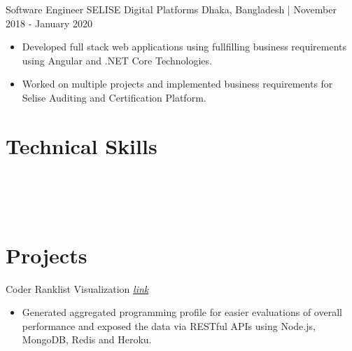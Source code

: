 \documentclass{resumestyle}
\begin{document}
    \vspace{4pt}%


    \worksubsection%
        {Software Engineer}%
        {SELISE Digital Platforms}%
        {Dhaka, Bangladesh | November 2018 - January 2020}%
    
    \begin{itemize}[labelsep=4pt,leftmargin=*,topsep=5pt,partopsep=0pt,itemsep=1pt]%
        \item Developed full stack web applications using fullfilling business requirements using Angular and .NET Core Technologies.%
        \item Worked on multiple projects and implemented business requirements for Selise Auditing and Certification Platform.%
    \end{itemize}%

    \vspace{0pt}%

\section{Technical Skills}%
\enspace%
\enspace%
\enspace%
\thinspace\thinspace%
\vspace{4pt}\\%
\enspace%
\enspace%
\enspace%
\vspace{4pt}\\%
\thinspace\thinspace%
\thinspace\thinspace%
\enspace%
\enspace%
\vspace{4pt}\\%
\thinspace\thinspace%
\thinspace\thinspace%
\thinspace\thinspace%
%


\section{Projects}%
    
    \projectsubsection%
        {Coder Ranklist}%
        {Visualization \hfill \textit{\href{https://www.lus.ac.bd/cp__trashed/ranklist/}{\textcolor{link}{link}}}}%
    \begin{itemize}[labelsep=4pt,leftmargin=*,topsep=5pt,partopsep=0pt,itemsep=1pt]%
        \item Generated aggregated programming profile for easier evaluations of overall performance and exposed the data via RESTful APIs using Node.js, MongoDB, Redis and Heroku.
    \end{itemize}%
\end{document}
